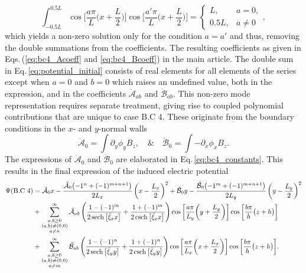 \documentclass[aps,prfluids,reprint,superscriptaddress]{revtex4-2}
\newcommand{\ii}[1]{\text{#1}}
\newcommand{\nn}{\nonumber}
\newcommand{\mref}[1]{{\hypersetup{linkcolor=black}\ref{#1}}}
\newcommand{\meqref}[1]{{\hypersetup{linkcolor=black}\eqref{#1}}}
\numberwithin{equation}{section}
\begin{document}
\begin{equation}
	\int_{-0.5L}^{0.5L}
	\cos{\biggl[ \frac{a\pi}{L}\biggl(x + \frac{L}{2}\biggr)\biggr]}
	\cos{\biggl[ \frac{a'\pi}{L}\biggl(x + \frac{L}{2}\biggr)\biggr]}
	=
	\left\{
	\begin{array}{cc}
		L, & a=0,
		\\
		0.5L, & a\neq 0
	\end{array}
	\right. ,
\end{equation}
which yields a non-zero solution only for the condition $a=a'$ and thus, removing the double summations from the coefficients. The resulting coefficients as given in Eqs.\,(\mref{eq:bc4_Acoeff} and \mref{eq:bc4_Bcoeff}) in the main article. The double sum in Eq.\,\eqref{eq:potential_initial} consists of real elements for all elements of the series except when $a=0$ and $b=0$ which raises an undefined value, both in the expression, and in the coefficients $\ddot{\mathcal{A}}_{ab}$ and $\ddot{\mathcal{B}}_{ab}$. This non-zero mode representation requires separate treatment, giving rise to coupled polynomial contributions that are unique to case B.C 4. These originate from the boundary conditions in the $x$- and $y$-normal walls
\begin{equation}
	\ddot{\mathcal{A}}_{0} = \int \partial_y\phi_y B_z, \quad \& \quad
	\ddot{\mathcal{B}}_{0} = \int -\partial_x \phi_x B_z .
\end{equation}
The expressions of $\ddot{\mathcal{A}}_{0}$ and $\ddot{\mathcal{B}}_{0}$ are elaborated in Eq.\,\meqref{eq:bc4_constants}. This results in the final expression of the induced electric potential
\begin{align}
	\nn
	\Psi (\ii{B.C 4})&= 
	\ddot{\mathcal{A}}_{0}x - \frac{\ddot{\mathcal{A}}_{0} \bigl(-1^n + (-1)^{m+n+1} \bigr) }{2L_x}
	\left(x- \frac{L_x}{2}\right)^2
	+
	\ddot{\mathcal{B}}_{0}y - \frac{\ddot{\mathcal{B}}_{0} \bigl(-1^m + (-1)^{m+n+1} \bigr) }{2L_y}
	\left(y- \frac{L_y}{2}\right)^2
	\\
	\nn
	&+
	\sum_{\substack{a, b \geq 0 \\ (a,b) 
			\neq (0,0) \\
			a\neq n	
	}}^{\infty}
	\ddot{\mathcal A}_{ab} 
	\left(
	\frac{1-(-1)^m}{2\sech{\bigl[ \ddot\xi_x x \bigr]}} + \frac{1+(-1)^m}{2\csch{\bigl[ \ddot\xi_x x \bigr]}}
	\right)
	\cos{\biggl[ \frac{a\pi}{L_y}\biggl(y + \frac{L_y}{2}\biggr)\biggr]}
	\cos{\biggl[ \frac{b\pi}{h}\bigl(z +  h\bigr)\biggr]} 
	\\
	&+
	\sum_{\substack{a, b \geq 0 \\ (a,b) 
			\neq (0,0) \\
			a\neq m	
	}}^{\infty}
	\ddot{\mathcal B}_{ab} 
	\left(
	\frac{1-(-1)^n}{2\sech{\bigl[ \ddot\xi_y y \bigr]}} + \frac{1+(-1)^n}{2\csch{\bigl[ \ddot\xi_y y \bigr]}}
	\right)
	\cos{\biggl[ \frac{a\pi}{L_x}\biggl(x + \frac{L_x}{2}\biggr)\biggr]}
	\cos{\biggl[ \frac{b\pi}{h}\bigl(z +  h\bigr)\biggr]}
.
\end{align}
\end{document}

